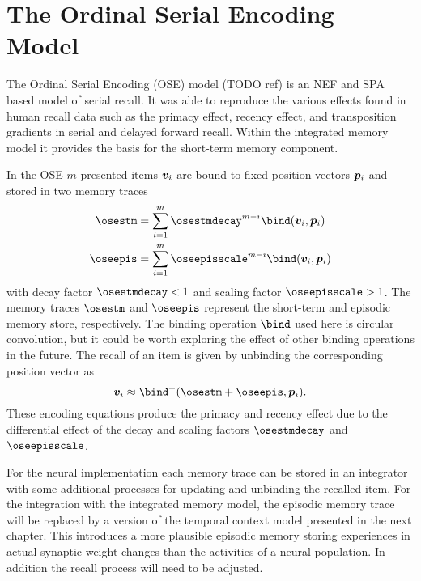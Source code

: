 \chapter{The Ordinal Serial Encoding Model}
The Ordinal Serial Encoding (OSE) model (TODO ref) is an NEF and SPA based model of serial recall.
It was able to reproduce the various effects found in human recall data such as the primacy effect, recency effect, and transposition gradients in serial and delayed forward recall.
Within the integrated memory model it provides the basis for the short-term memory component.

In the OSE $m$ presented items $\bm{v}_i$ are bound to fixed position vectors $\bm{p}_i$ and stored in two memory traces
\begin{align}
    \osestm &= \sum_{i=1}^m \osestmdecay^{m - i} \bind(\vc v_i, \vc p_i) \\
    \oseepis &= \sum_{i=1}^m \oseepisscale^{m - i} \bind(\vc v_i, \vc p_i)
\end{align}
with decay factor $\osestmdecay < 1$ and scaling factor $\oseepisscale > 1$.
The memory traces $\osestm$ and $\oseepis$ represent the short-term and episodic memory store, respectively.
The binding operation $\bind$ used here is circular convolution, but it could be worth exploring the effect of other binding operations in the future.
The recall of an item is given by unbinding the corresponding position vector as
\begin{equation}
    \vc v_i \approx \bind^+(\osestm + \oseepis, \vc p_i) \text{.}
\end{equation}
These encoding equations produce the primacy and recency effect due to the differential effect of the decay and scaling factors $\osestmdecay$ and $\oseepisscale$.

For the neural implementation each memory trace can be stored in an integrator with some additional processes for updating and unbinding the recalled item.
For the integration with the integrated memory model, the episodic memory trace will be replaced by a version of the temporal context model presented in the next chapter.
This introduces a more plausible episodic memory storing experiences in actual synaptic weight changes than the activities of a neural population.
In addition the recall process will need to be adjusted.
